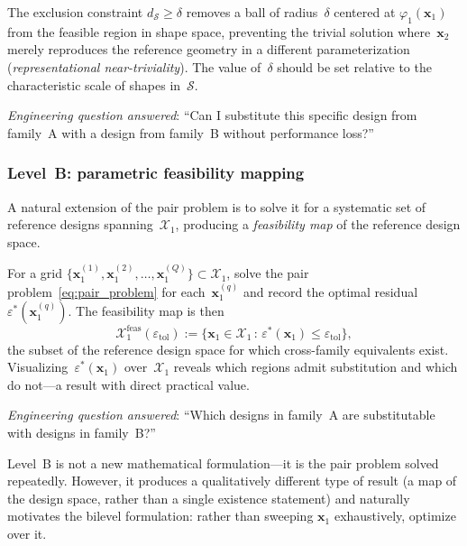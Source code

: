 The exclusion constraint $d_{\mathcal{S}} \geq \delta$ removes a ball of radius~$\delta$ centered at $\varphi_1(\mathbf{x}_1)$ from the feasible region in shape space, preventing the trivial solution where~$\mathbf{x}_2$ merely reproduces the reference geometry in a different parameterization (\emph{representational near-triviality}). The value of~$\delta$ should be set relative to the characteristic scale of shapes in~$\mathcal{S}$.

\medskip
\noindent\emph{Engineering question answered}: ``Can I substitute this specific design from family~A with a design from family~B without performance loss?''


\subsubsection{Level~B: parametric feasibility mapping}
\label{sec:feasibility_map}

A natural extension of the pair problem is to solve it for a systematic set of reference designs spanning~$\mathcal{X}_1$, producing a \emph{feasibility map} of the reference design space.

For a grid $\{\mathbf{x}_1^{(1)}, \mathbf{x}_1^{(2)}, \ldots, \mathbf{x}_1^{(Q)}\} \subset \mathcal{X}_1$, solve the pair problem~\eqref{eq:pair_problem} for each~$\mathbf{x}_1^{(q)}$ and record the optimal residual $\varepsilon^*(\mathbf{x}_1^{(q)})$. The feasibility map is then
\begin{equation}
    \mathcal{X}_1^{\mathrm{feas}}(\varepsilon_{\mathrm{tol}})
    := \bigl\{ \mathbf{x}_1 \in \mathcal{X}_1 \,:\,
    \varepsilon^*(\mathbf{x}_1) \leq \varepsilon_{\mathrm{tol}} \bigr\},
    \label{eq:feasibility_map}
\end{equation}
the subset of the reference design space for which cross-family equivalents exist. Visualizing~$\varepsilon^*(\mathbf{x}_1)$ over~$\mathcal{X}_1$ reveals which regions admit substitution and which do not---a result with direct practical value.

\medskip
\noindent\emph{Engineering question answered}: ``Which designs in family~A are substitutable with designs in family~B?''

\begin{remark}
Level~B is not a new mathematical formulation---it is the pair problem solved repeatedly. However, it produces a qualitatively different type of result (a map of the design space, rather than a single existence statement) and naturally motivates the bilevel formulation: rather than sweeping $\mathbf{x}_1$ exhaustively, optimize over it.
\end{remark}


